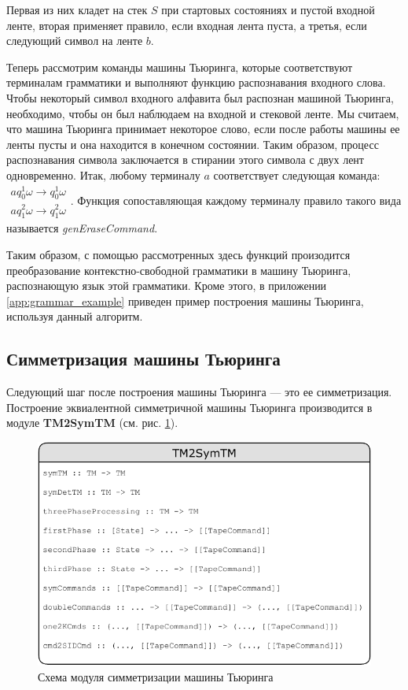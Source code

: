 \documentclass[14pt]{matmex-diploma-custom}
\begin{document}
Первая из них кладет на стек $S$ при стартовых состояниях и пустой входной ленте, вторая применяет правило, если входная лента пуста, а третья, если следующий символ на ленте $b$.  

Теперь рассмотрим команды машины Тьюринга, которые соответствуют терминалам грамматики и выполняют
функцию распознавания входного слова. Чтобы некоторый символ входного алфавита был распознан 
машиной Тьюринга, необходимо, чтобы он был наблюдаем на входной и стековой ленте. Мы считаем, что
машина Тьюринга принимает некоторое слово, если после работы машины ее ленты пусты и она находится в
конечном состоянии. Таким образом, процесс распознавания символа заключается в стирании этого символа
с двух лент одновременно. Итак, любому терминалу $a$ соответствует следующая команда:
$\begin{array}{lcl}
    a q_0^1 \omega \to q_0^1 \omega \\
    a q_1^2 \omega \to q_1^2 \omega 
\end{array}$. Функция сопоставляющая каждому терминалу правило такого вида называется \textit{genEraseCommand}.

Таким образом, с помощью рассмотренных здесь функций произодится преобразование контекстно-свободной грамматики в машину Тьюринга, распознающую язык этой грамматики. Кроме этого, в приложении \ref{app:grammar_example} приведен пример построения машины Тьюринга, используя данный алгоритм. 

\subsection{Симметризация машины Тьюринга}
Следующий шаг после построения машины Тьюринга --- это ее симметризация. Построение эквиалентной симметричной машины Тьюринга производится в модуле \textbf{TM2SymTM} (см. рис. \ref{fig:TM2SymTM}).

\begin{figure}[H]
\centering
  \includegraphics[width=\linewidth]{pics/TM2SymTM.pdf}
  \caption{Схема модуля симметризации машины Тьюринга}
  \label{fig:TM2SymTM}
\end{figure}
\end{document}
